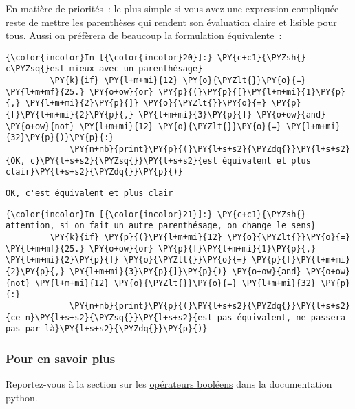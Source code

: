     En matière de priorités~: le plus simple si vous avez une expression
compliquée reste de mettre les parenthèses qui rendent son évaluation
claire et lisible pour tous. Aussi on préfèrera de beaucoup la
formulation équivalente~:

    \begin{Verbatim}[commandchars=\\\{\}]
{\color{incolor}In [{\color{incolor}20}]:} \PY{c+c1}{\PYZsh{} c\PYZsq{}est mieux avec un parenthésage}
         \PY{k}{if} \PY{l+m+mi}{12} \PY{o}{\PYZlt{}}\PY{o}{=} \PY{l+m+mf}{25.} \PY{o+ow}{or} \PY{p}{(}\PY{p}{[}\PY{l+m+mi}{1}\PY{p}{,} \PY{l+m+mi}{2}\PY{p}{]} \PY{o}{\PYZlt{}}\PY{o}{=} \PY{p}{[}\PY{l+m+mi}{2}\PY{p}{,} \PY{l+m+mi}{3}\PY{p}{]} \PY{o+ow}{and} \PY{o+ow}{not} \PY{l+m+mi}{12} \PY{o}{\PYZlt{}}\PY{o}{=} \PY{l+m+mi}{32}\PY{p}{)}\PY{p}{:}
             \PY{n+nb}{print}\PY{p}{(}\PY{l+s+s2}{\PYZdq{}}\PY{l+s+s2}{OK, c}\PY{l+s+s2}{\PYZsq{}}\PY{l+s+s2}{est équivalent et plus clair}\PY{l+s+s2}{\PYZdq{}}\PY{p}{)}
\end{Verbatim}


    \begin{Verbatim}[commandchars=\\\{\}]
OK, c'est équivalent et plus clair

    \end{Verbatim}

    \begin{Verbatim}[commandchars=\\\{\}]
{\color{incolor}In [{\color{incolor}21}]:} \PY{c+c1}{\PYZsh{} attention, si on fait un autre parenthésage, on change le sens}
         \PY{k}{if} \PY{p}{(}\PY{l+m+mi}{12} \PY{o}{\PYZlt{}}\PY{o}{=} \PY{l+m+mf}{25.} \PY{o+ow}{or} \PY{p}{[}\PY{l+m+mi}{1}\PY{p}{,} \PY{l+m+mi}{2}\PY{p}{]} \PY{o}{\PYZlt{}}\PY{o}{=} \PY{p}{[}\PY{l+m+mi}{2}\PY{p}{,} \PY{l+m+mi}{3}\PY{p}{]}\PY{p}{)} \PY{o+ow}{and} \PY{o+ow}{not} \PY{l+m+mi}{12} \PY{o}{\PYZlt{}}\PY{o}{=} \PY{l+m+mi}{32} \PY{p}{:}
             \PY{n+nb}{print}\PY{p}{(}\PY{l+s+s2}{\PYZdq{}}\PY{l+s+s2}{ce n}\PY{l+s+s2}{\PYZsq{}}\PY{l+s+s2}{est pas équivalent, ne passera pas par là}\PY{l+s+s2}{\PYZdq{}}\PY{p}{)}
\end{Verbatim}


    \hypertarget{pour-en-savoir-plus}{%
\subsubsection{Pour en savoir plus}\label{pour-en-savoir-plus}}

    Reportez-vous à la section sur les
\href{https://docs.python.org/3/library/stdtypes.html\#truth-value-testing}{opérateurs
booléens} dans la documentation python.


    
    
    
